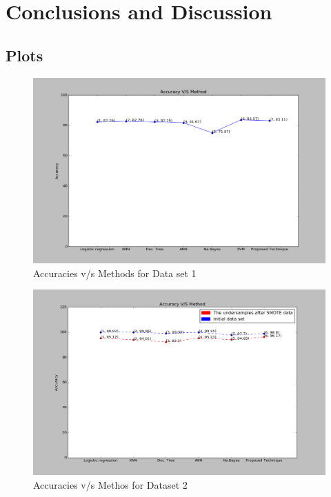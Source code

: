 \chapter{Conclusions and Discussion}\label{final}
\section{Plots}
\begin{figure}
  \centering
  \includegraphics[scale=.45]{i1.png}
  \caption{Accuracies v/s Methods for Data set 1}  
\end{figure}
\begin{figure}
  \centering
  \includegraphics[scale=.45]{i2.png}
  \caption{Accuracies v/s Methos for Dataset 2}
  
\end{figure}
